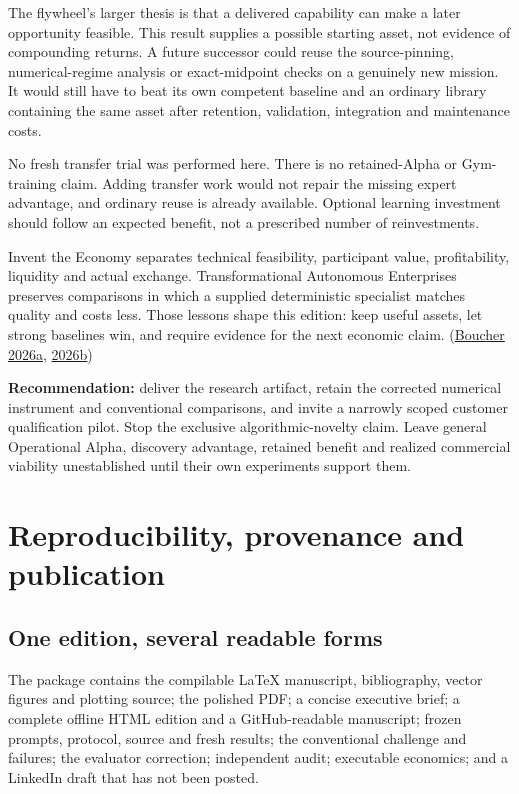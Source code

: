 \documentclass[
  10pt,
]{article}
\newcommand{\editionbreak}{\par\bigskip\Needspace{8\baselineskip}}
\begin{document}
The flywheel's larger thesis is that a delivered capability can make a
later opportunity feasible. This result supplies a possible starting
asset, not evidence of compounding returns. A future successor could
reuse the source-pinning, numerical-regime analysis or exact-midpoint
checks on a genuinely new mission. It would still have to beat its own
competent baseline and an ordinary library containing the same asset
after retention, validation, integration and maintenance costs.

No fresh transfer trial was performed here. There is no retained-Alpha
or Gym-training claim. Adding transfer work would not repair the missing
expert advantage, and ordinary reuse is already available. Optional
learning investment should follow an expected benefit, not a prescribed
number of reinvestments.

Invent the Economy separates technical feasibility, participant value,
profitability, liquidity and actual exchange. Transformational
Autonomous Enterprises preserves comparisons in which a supplied
deterministic specialist matches quality and costs less. Those lessons
shape this edition: keep useful assets, let strong baselines win, and
require evidence for the next economic claim.
(\protect\hyperlink{ref-economy}{Boucher 2026a},
\protect\hyperlink{ref-tae}{2026b})

\textbf{Recommendation:} deliver the research artifact, retain the
corrected numerical instrument and conventional comparisons, and invite
a narrowly scoped customer qualification pilot. Stop the exclusive
algorithmic-novelty claim. Leave general Operational Alpha, discovery
advantage, retained benefit and realized commercial viability
unestablished until their own experiments support them.

\editionbreak

\hypertarget{reproducibility-provenance-and-publication}{%
\section{Reproducibility, provenance and
publication}\label{reproducibility-provenance-and-publication}}

\hypertarget{one-edition-several-readable-forms}{%
\subsection{One edition, several readable
forms}\label{one-edition-several-readable-forms}}

The package contains the compilable LaTeX manuscript, bibliography,
vector figures and plotting source; the polished PDF; a concise
executive brief; a complete offline HTML edition and a GitHub-readable
manuscript; frozen prompts, protocol, source and fresh results; the
conventional challenge and failures; the evaluator correction;
independent audit; executable economics; and a LinkedIn draft that has
not been posted.
\end{document}

